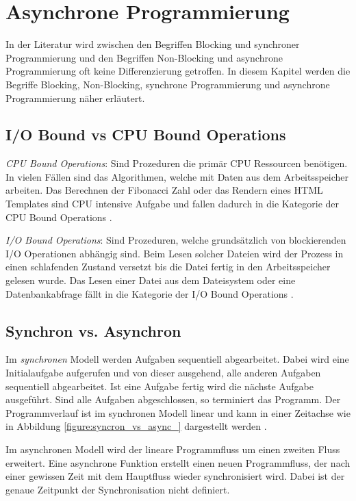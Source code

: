 \section{Asynchrone Programmierung}

In der Literatur wird zwischen den Begriffen Blocking und synchroner Programmierung und den Begriffen Non-Blocking und asynchrone Programmierung oft keine Differenzierung getroffen. In diesem Kapitel werden die Begriffe Blocking, Non-Blocking, synchrone Programmierung und asynchrone Programmierung näher erläutert. 

\subsection{I/O Bound vs CPU Bound Operations}

\emph{CPU Bound Operations}: Sind Prozeduren die primär CPU Ressourcen benötigen. In vielen Fällen sind das Algorithmen, welche mit Daten aus dem Arbeitsspeicher arbeiten. Das Berechnen der Fibonacci Zahl oder das Rendern eines HTML Templates sind CPU intensive Aufgabe und fallen dadurch in die Kategorie der CPU Bound Operations \cite[p. 70]{Erb2012}. 

\emph{I/O Bound Operations}: Sind Prozeduren, welche grundsätzlich von blockierenden I/O Operationen abhängig sind. Beim Lesen solcher Dateien wird der Prozess in einen schlafenden Zustand versetzt bis die Datei fertig in den Arbeitsspeicher gelesen wurde. Das Lesen einer Datei aus dem Dateisystem oder eine Datenbankabfrage fällt in die Kategorie der I/O Bound Operations \cite[p. 70]{Erb2012}. 

\subsection{Synchron vs. Asynchron}

Im \emph{synchronen} Modell werden Aufgaben sequentiell abgearbeitet. Dabei wird eine Initialaufgabe aufgerufen und von dieser ausgehend, alle anderen Aufgaben sequentiell abgearbeitet. Ist eine Aufgabe fertig wird die nächste Aufgabe ausgeführt. Sind alle Aufgaben abgeschlossen, so terminiert das Programm. Der Programmverlauf ist im synchronen Modell linear und kann in einer Zeitachse wie in Abbildung \ref{figure:syncron_vs_async_} dargestellt werden \cite[]{Pet2015}.

Im asynchronen Modell wird der lineare Programmfluss um einen zweiten Fluss erweitert. Eine asynchrone Funktion erstellt einen neuen Programmfluss, der nach einer gewissen Zeit mit dem Hauptfluss wieder synchronisiert wird. Dabei ist der genaue Zeitpunkt der Synchronisation nicht definiert. 


